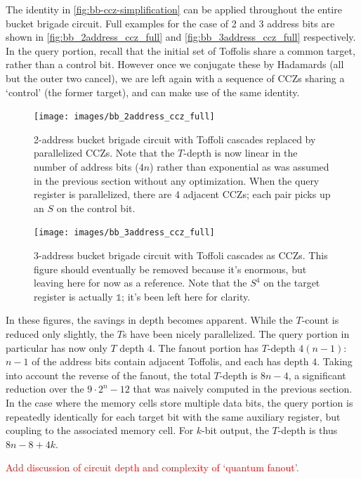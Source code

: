 \documentclass[a4paper,12pt]{article}
\newcommand\todo[1]{\textcolor{red}{#1}}
\begin{document}
The identity in \autoref{fig:bb-ccz-simplification} can be applied throughout the entire bucket brigade circuit. 
Full examples for the case of 2 and 3 address bits are shown in \autoref{fig:bb_2address_ccz_full} and \autoref{fig:bb_3address_ccz_full} respectively. 
In the query portion, recall that the initial set of Toffolis share a common target, rather than a control bit.
However once we conjugate these by Hadamards (all but the outer two cancel), we are left again with a sequence of CCZs sharing a `control' (the former target), and can make use of the same identity.

\begin{figure}
 \captionsetup{width=.89\linewidth}
 \texttt{[image: images/bb\_2address\_ccz\_full]}
 \caption{2-address bucket brigade circuit with Toffoli cascades replaced by parallelized CCZs. 
 Note that the $T$-depth is now linear in the number of address bits ($4n$) rather than exponential as was assumed in the previous section without any optimization.
 When the query register is parallelized, there are 4 adjacent CCZs; each pair picks up an $S$ on the control bit.}
 \label{fig:bb_2address_ccz_full}
\end{figure}

\begin{figure}
 \captionsetup{width=.89\linewidth}
 \texttt{[image: images/bb\_3address\_ccz\_full]}
 \caption{3-address bucket brigade circuit with Toffoli cascades as CCZs. 
 This figure should eventually be removed because it's enormous, but leaving here for now as a reference.
 Note that the $S^4$ on the target register is actually $\mathds{1}$; it's been left here for clarity.}
 \label{fig:bb_3address_ccz_full}
\end{figure}

In these figures, the savings in depth becomes apparent.
While the $T$-count is reduced only slightly, the $T$s have been nicely parallelized.
The query portion in particular has now only $T$ depth 4.
The fanout portion has $T$-depth $4(n-1)$: $n - 1$ of the address bits contain adjacent Toffolis, and each has depth $4$.
Taking into account the reverse of the fanout, the total $T$-depth is $8n - 4$, a significant reduction over the $9 \cdot 2^n - 12$ that was naively computed in the previous section.
In the case where the memory cells store multiple data bits, the query portion is repeatedly identically for each target bit with the same auxiliary register, but coupling to the associated memory cell. 
For $k$-bit output, the $T$-depth is thus $8n - 8 + 4k$.

\todo{Add discussion of circuit depth and complexity of `quantum fanout'.}
\end{document}
